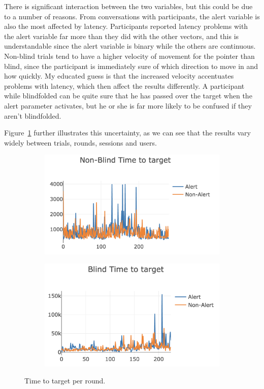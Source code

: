 \documentclass[
hidelinks,
12pt, %
oneside, %
english, %
doublespacing, %
headsepline, %
]{MastersDoctoralThesis} %
\begin{document}
There is significant interaction between the two variables, but this could be due to a number of reasons. From conversations with participants, the alert variable is also the most affected by latency. Participants reported latency problems with the alert variable far more than they did with the other vectors, and this is understandable since the alert variable is binary while the others are continuous. Non-blind trials tend to have a higher velocity of movement for the pointer than blind, since the participant is immediately sure of which direction to move in and how quickly. My educated guess is that the increased velocity accentuates problems with latency, which then affect the results differently. A participant while blindfolded can be quite sure that he has passed over the target when the alert parameter activates, but he or she is far more likely to be confused if they aren't blindfolded.

Figure~\ref{fig:timing} further illustrates this uncertainty, as we can see that the results vary widely between trials, rounds, sessions and users.

\begin{figure}[th]
	\centering
  \begin{subfigure}[b]{0.4\textwidth}
		\centering
    \includegraphics[width=1.2\textwidth]{images/nonblindtiming}
		\decoRule
  \end{subfigure}
  \begin{subfigure}[b]{0.4\textwidth}
		\centering
    \includegraphics[width=1.2\textwidth]{images/blindtiming}
		\decoRule
  \end{subfigure}
	\caption[Phase 2 Timing Graph]{Time to target per round.}
	\label{fig:timing}
\end{figure}
\end{document}
